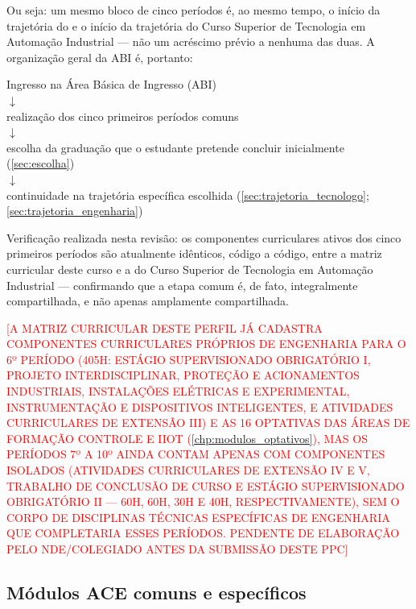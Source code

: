 Ou seja: um mesmo bloco de cinco períodos é, ao mesmo tempo, o início da trajetória do \ppccurso e o início da trajetória do Curso Superior de Tecnologia em Automação Industrial — não um acréscimo prévio a nenhuma das duas. A organização geral da ABI é, portanto:

\begin{center}
Ingresso na Área Básica de Ingresso (ABI) \\
$\downarrow$ \\
realização dos cinco primeiros períodos comuns \\
$\downarrow$ \\
escolha da graduação que o estudante pretende concluir inicialmente (\autoref{sec:escolha}) \\
$\downarrow$ \\
continuidade na trajetória específica escolhida (\autoref{sec:trajetoria_tecnologo}; \autoref{sec:trajetoria_engenharia})
\end{center}

Verificação realizada nesta revisão: os componentes curriculares ativos dos cinco primeiros períodos são atualmente idênticos, código a código, entre a matriz curricular deste curso e a do Curso Superior de Tecnologia em Automação Industrial — confirmando que a etapa comum é, de fato, integralmente compartilhada, e não apenas amplamente compartilhada.

\textcolor{red}{[A MATRIZ CURRICULAR DESTE PERFIL JÁ CADASTRA COMPONENTES CURRICULARES PRÓPRIOS DE ENGENHARIA PARA O 6º PERÍODO (405H: ESTÁGIO SUPERVISIONADO OBRIGATÓRIO I, PROJETO INTERDISCIPLINAR, PROTEÇÃO E ACIONAMENTOS INDUSTRIAIS, INSTALAÇÕES ELÉTRICAS E EXPERIMENTAL, INSTRUMENTAÇÃO E DISPOSITIVOS INTELIGENTES, E ATIVIDADES CURRICULARES DE EXTENSÃO III) E AS 16 OPTATIVAS DAS ÁREAS DE FORMAÇÃO CONTROLE E IIOT (\autoref{chp:modulos_optativos}), MAS OS PERÍODOS 7º A 10º AINDA CONTAM APENAS COM COMPONENTES ISOLADOS (ATIVIDADES CURRICULARES DE EXTENSÃO IV E V, TRABALHO DE CONCLUSÃO DE CURSO E ESTÁGIO SUPERVISIONADO OBRIGATÓRIO II — 60H, 60H, 30H E 40H, RESPECTIVAMENTE), SEM O CORPO DE DISCIPLINAS TÉCNICAS ESPECÍFICAS DE ENGENHARIA QUE COMPLETARIA ESSES PERÍODOS. PENDENTE DE ELABORAÇÃO PELO NDE/COLEGIADO ANTES DA SUBMISSÃO DESTE PPC]}

\subsection{Módulos ACE comuns e específicos}

